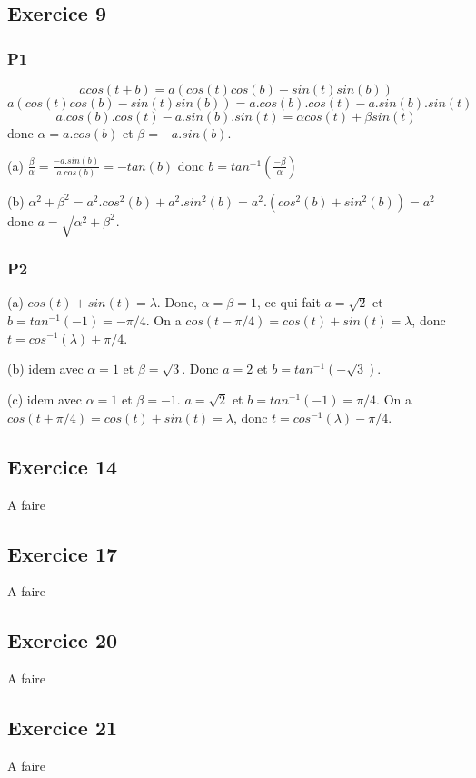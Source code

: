 \documentclass[]{book}
\theoremstyle{definition}
\begin{document}
  
\subsection*{Exercice 9}
\subsubsection*{P1}
$$acos(t+b) = a(cos(t)cos(b)-sin(t)sin(b))$$ 
$$a(cos(t)cos(b)-sin(t)sin(b)) = a.cos(b).cos(t) - a.sin(b).sin(t)$$
$$a.cos(b).cos(t) - a.sin(b).sin(t) = \alpha cos(t) + \beta sin(t)$$ 
donc $\alpha = a.cos(b)$ et $\beta=-a.sin(b)$. 

(a) $\frac{\beta}{\alpha} = \frac{-a.sin(b)}{a.cos(b)} = -tan(b)$ donc $b=tan^{-1}(\frac{-\beta}{\alpha})$


(b) $\alpha^2 + \beta^2 = a^2.cos^2(b) + a^2.sin^2(b) = a^2.(cos^2(b) + sin^2(b)) = a^2$ donc $a=\sqrt{\alpha^2 + \beta^2}$.

\subsubsection*{P2}
(a) $cos(t) + sin(t) = \lambda$. Donc, $\alpha = \beta = 1$, ce qui fait $a = \sqrt{2}$ et $b=tan^{-1}(-1)=-\pi/4$. On a $cos(t-\pi/4) = cos(t) + sin(t) = \lambda$, donc $t=cos^{-1}(\lambda)+\pi/4$.


(b) idem avec $\alpha = 1$ et $\beta = \sqrt{3}$. Donc $a=2$ et $b=tan^{-1}(-\sqrt{3})$.

(c) idem avec $\alpha = 1$ et $\beta = -1$. $a = \sqrt{2}$ et $b=tan^{-1}(-1)=\pi/4$. On a $cos(t+\pi/4) = cos(t) + sin(t) = \lambda$, donc $t=cos^{-1}(\lambda)-\pi/4$.

\subsection*{Exercice 14}
A faire


\subsection*{Exercice 17}
A faire


\subsection*{Exercice 20}
A faire


\subsection*{Exercice 21}
A faire
\end{document}
